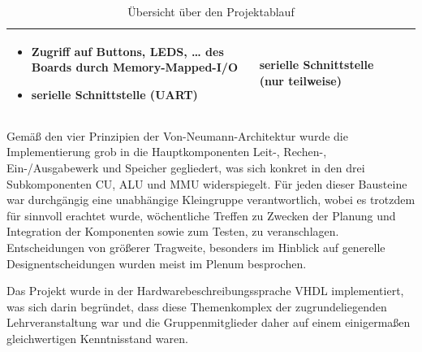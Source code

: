 \begin{table}[H]
\begin{tabular}{|p{50pt}|p{80pt}|p{220pt}|p{110pt}|}
\begin{itemize}[noitemsep,topsep=0pt]
                                                       \item Zugriff auf Buttons, LEDS, \dots{} des Boards durch Memory-Mapped-I/O
                                                       \item serielle Schnittstelle (UART)
                                                       \end{itemize}                                                                    & serielle Schnittstelle (nur teilweise)        \\
\hline
\end{tabular}
\caption{\"Ubersicht \"uber den Projektablauf}
\end{table}

Gem\"a\ss{} den vier Prinzipien der Von-Neumann-Architektur wurde die Implementierung grob in die Hauptkomponenten Leit-, Rechen-, Ein-/Ausgabewerk und Speicher gegliedert, was sich konkret in den drei Subkomponenten CU, ALU und MMU widerspiegelt. F\"ur jeden dieser Bausteine war durchg\"angig eine unabh\"angige Kleingruppe verantwortlich, wobei es trotzdem f\"ur sinnvoll erachtet wurde, w\"ochentliche Treffen zu Zwecken der Planung und Integration der Komponenten sowie zum Testen, zu veranschlagen. Entscheidungen von gr\"o\ss{}erer Tragweite, besonders im Hinblick auf generelle Designentscheidungen wurden meist im Plenum besprochen.


Das Projekt wurde in der Hardwarebeschreibungssprache VHDL implementiert, was sich darin begr\"undet, dass diese Themenkomplex der zugrundeliegenden Lehrveranstaltung war und die Gruppenmitglieder daher auf einem einigerma\ss{}en gleichwertigen Kenntnisstand waren.

